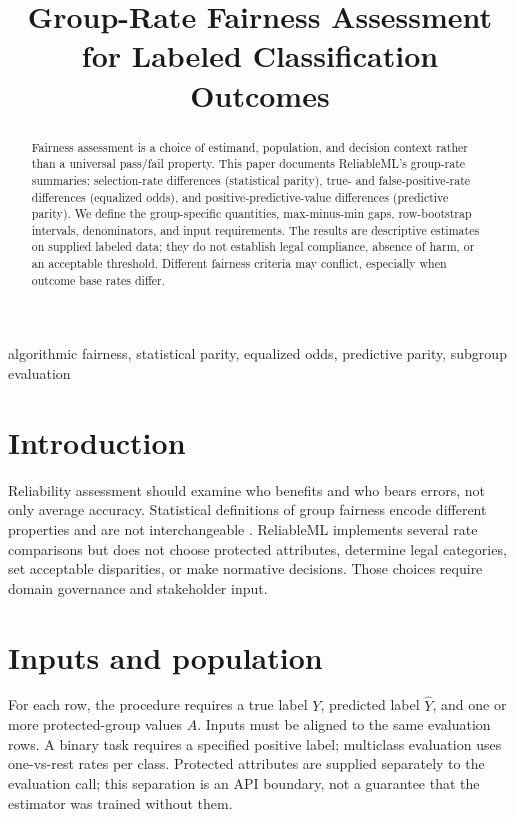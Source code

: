 \documentclass[conference]{IEEEtran}
\title{Group-Rate Fairness Assessment for Labeled Classification Outcomes}
\author{
\jabulaniauthor
\and
\martinchanzauthor
\and
\oloratoauthor
\and
\mfundoauthor
}
\begin{document}
\maketitle

\begin{abstract}
Fairness assessment is a choice of estimand, population, and decision context rather than a universal pass/fail property. This paper documents ReliableML's group-rate summaries: selection-rate differences (statistical parity), true- and false-positive-rate differences (equalized odds), and positive-predictive-value differences (predictive parity). We define the group-specific quantities, max-minus-min gaps, row-bootstrap intervals, denominators, and input requirements. The results are descriptive estimates on supplied labeled data; they do not establish legal compliance, absence of harm, or an acceptable threshold. Different fairness criteria may conflict, especially when outcome base rates differ.
\end{abstract}

\begin{IEEEkeywords}
algorithmic fairness, statistical parity, equalized odds, predictive parity, subgroup evaluation
\end{IEEEkeywords}

\section{Introduction}
Reliability assessment should examine who benefits and who bears errors, not only average accuracy. Statistical definitions of group fairness encode different properties and are not interchangeable \cite{hardt2016,dwork2012,chouldechova2017}. ReliableML implements several rate comparisons \cite{software} but does not choose protected attributes, determine legal categories, set acceptable disparities, or make normative decisions. Those choices require domain governance and stakeholder input.

\section{Inputs and population}
For each row, the procedure requires a true label \(Y\), predicted label \(\widehat Y\), and one or more protected-group values \(A\). Inputs must be aligned to the same evaluation rows. A binary task requires a specified positive label; multiclass evaluation uses one-vs-rest rates per class. Protected attributes are supplied separately to the evaluation call; this separation is an API boundary, not a guarantee that the estimator was trained without them.
\end{document}
